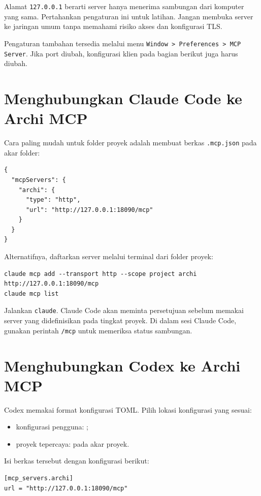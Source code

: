 Alamat \texttt{127.0.0.1} berarti server hanya menerima sambungan dari komputer
yang sama. Pertahankan pengaturan ini untuk latihan. Jangan membuka server ke
jaringan umum tanpa memahami risiko akses dan konfigurasi TLS.

Pengaturan tambahan tersedia melalui menu \texttt{Window > Preferences > MCP
Server}. Jika port diubah, konfigurasi klien pada bagian berikut juga harus
diubah.

\section{Menghubungkan Claude Code ke Archi MCP}

Cara paling mudah untuk folder proyek adalah membuat berkas
\texttt{.mcp.json} pada akar folder:

\begin{lstlisting}
{
  "mcpServers": {
    "archi": {
      "type": "http",
      "url": "http://127.0.0.1:18090/mcp"
    }
  }
}
\end{lstlisting}

Alternatifnya, daftarkan server melalui terminal dari folder proyek:

\begin{lstlisting}
claude mcp add --transport http --scope project archi http://127.0.0.1:18090/mcp
claude mcp list
\end{lstlisting}

Jalankan \texttt{claude}. Claude Code akan meminta persetujuan sebelum memakai
server yang didefinisikan pada tingkat proyek. Di dalam sesi Claude Code,
gunakan perintah \texttt{/mcp} untuk memeriksa status sambungan.

\section{Menghubungkan Codex ke Archi MCP}

Codex memakai format konfigurasi TOML. Pilih lokasi konfigurasi yang sesuai:

\begin{itemize}
  \item konfigurasi pengguna: ;
  \item proyek tepercaya:  pada akar proyek.
\end{itemize}

Isi berkas tersebut dengan konfigurasi berikut:

\begin{lstlisting}
[mcp_servers.archi]
url = "http://127.0.0.1:18090/mcp"
\end{lstlisting}

